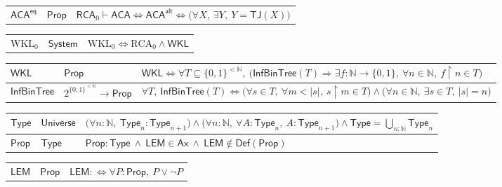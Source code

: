 \documentclass[11pt,reqno]{amsart}
\theoremstyle{blueplain}
\numberwithin{equation}{section}
\begin{document}
{\begin{tabular}{|m{4cm}|m{5cm}|m{9cm}|}
		\hline
		$\mathsf{ACA}^{\mathsf{eq}}$ & $\mathsf{Prop}$ & $\mathsf{RCA}_0 \vdash \mathsf{ACA} \Leftrightarrow \mathsf{ACA}^{\mathsf{alt}} \Leftrightarrow \bigl(\forall X,\ \exists Y,\ Y=\mathsf{TJ}(X)\bigr)$ \\
	\end{tabular}%
	\noindent \newline
	\noindent
	\begin{tabular}{|m{4cm}|m{5cm}|m{9cm}|}
		\hline
		$\mathrm{WKL}_0$ & $\mathsf{System}$ & $\mathrm{WKL}_0 \iff \mathrm{RCA}_0 \wedge \mathsf{WKL}$ \\
	\end{tabular}%
	\noindent \newline
	\noindent
	\begin{tabular}{|m{4cm}|m{5cm}|m{9cm}|}
		\hline
		$\mathsf{WKL}$ & $\mathsf{Prop}$ & $\mathsf{WKL} \iff \forall T\subseteq\{0,1\}^{<\mathbb{N}},\ \bigl(\mathsf{InfBinTree}(T)\Rightarrow\exists f:\mathbb{N}\to\{0,1\},\ \forall n\in\mathbb{N},\ f\!\upharpoonright n\in T\bigr)$ \\ \hline
		$\mathsf{InfBinTree}$ & $2^{\{0,1\}^{<\mathbb{N}}}\to\mathsf{Prop}$ & $\forall T,\ \mathsf{InfBinTree}(T) \iff \bigl(\forall s\in T,\ \forall m<|s|,\ s\!\upharpoonright m\in T\bigr) \wedge \bigl(\forall n\in\mathbb{N},\ \exists s\in T,\ |s|=n\bigr)$ \\
	\end{tabular}
	\noindent \newline
	\noindent
	\begin{tabular}{|m{4cm}|m{5cm}|m{9cm}|}
		\hline
		$\mathsf{Type}$ & $\mathsf{Universe}$ &
		$\bigl(\forall n:\mathbb{N},\ \mathsf{Type}_n:\mathsf{Type}_{n+1}\bigr)
		\wedge\bigl(\forall n:\mathbb{N},\ \forall A:\mathsf{Type}_n,\ A:\mathsf{Type}_{n+1}\bigr)
		\wedge\mathsf{Type}=\bigcup_{n:\mathbb{N}}\mathsf{Type}_n$ \\ \hline
		$\mathsf{Prop}$ & $\mathsf{Type}$ &
		$\mathsf{Prop}:\mathsf{Type}\ \wedge\ \mathsf{LEM}\in\mathsf{Ax}\ \wedge\ \mathsf{LEM}\notin\mathsf{Def}(\mathsf{Prop})$ \\
	\end{tabular}%
	\noindent \newline
	\noindent
	\begin{tabular}{|m{4cm}|m{5cm}|m{9cm}|}
		\hline
		$\mathsf{LEM}$ & $\mathsf{Prop}$ &
		$\mathsf{LEM}:\iff\forall P:\mathsf{Prop},\ P\vee\neg P$ \\
	\end{tabular}%
	\noindent \newline
}
\end{document}
